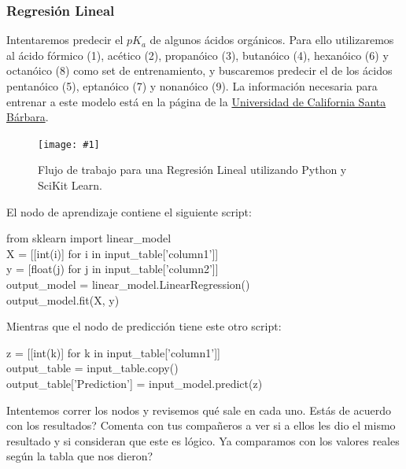 \documentclass[10pt,letterpaper]{article}
\newenvironment{Code}
{
\begin{lrbox}{\selvestebox}%
\begin{minipage}{\dimexpr\columnwidth-2\fboxsep\relax}
\fontfamily{\ttdefault}\selectfont
}
{\end{minipage}\end{lrbox}%
\begin{center}
\colorbox{light-gray}{\usebox{\selvestebox}}
\end{center}
}
\newcommand{\Picture}[3]
{
	\begin{figure}[H]
	\begin{center}
	\caption{#3}
	\texttt{[image: \#1]}
	\end{center}
	\end{figure}
}
\begin{document}
\subsubsection{Regresi\'on Lineal}
Intentaremos predecir el $pK_a$ de algunos \'acidos org\'anicos. Para ello utilizaremos al \'acido f\'ormico (1), ac\'etico (2), propan\'oico (3), butan\'oico (4), hexan\'oico (6) y octan\'oico (8) como set de entrenamiento, y buscaremos predecir el de los \'acidos pentan\'oico (5), eptan\'oico (7) y nonan\'oico (9). La informaci\'on necesaria para entrenar a este modelo est\'a en la p\'agina de la \href{https://labs.chem.ucsb.edu/zhang/liming/pdf/pKas_of_Organic_Acids_and_Bases.pdf}{Universidad de California Santa B\'arbara}.

\Picture{img/lin_reg.png}{0.55}{Flujo de trabajo para una Regresi\'on Lineal utilizando Python y SciKit Learn.}

\noindent El nodo de aprendizaje contiene el siguiente script:

\begin{Code}
from sklearn import linear\_model\\

X = [[int(i)] for i in input\_table['column1']]\\
y = [float(j) for j in input\_table['column2']]\\

output\_model = linear\_model.LinearRegression()\\
output\_model.fit(X, y)
\end{Code}

\noindent Mientras que el nodo de predicci\'on tiene este otro script:

\begin{Code}
z = [[int(k)] for k in input\_table['column1']]\\

output\_table = input\_table.copy()\\

output\_table['Prediction'] = input\_model.predict(z)
\end{Code}

Intentemos correr los nodos y revisemos qu\'e sale en cada uno. Est\'as de acuerdo con los resultados? Comenta con tus compa\~neros a ver si a ellos les dio el mismo resultado y si consideran que este es l\'ogico. Ya comparamos con los valores reales seg\'un la tabla que nos dieron?
\end{document}
